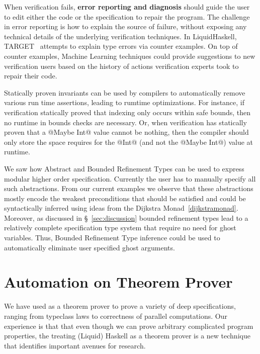 When verification fails, 
\textbf{error reporting and diagnosis} should guide the user 
to edit either the code or the specification to repair the program. 
%
The challenge in error reporting is how to explain 
the source of failure, 
without exposing any technical details 
of the underlying verification techniques. 
%
In LiquidHaskell, TARGET~\cite{TARGET} attempts to explain 
type errors via counter examples. 
%
On top of counter examples, %
Machine Learning techniques could 
provide suggestions to new verification users
based on the history of actions verification experts 
took to repair their code.  
% 

Statically proven invariants can be used by compilers 
to automatically remove various run time assertions, 
leading to rumtime optimizations.
For instance, if verification statically proved that indexing only occurs
within safe bounds, then no runtime in bounds checks are necessary. 
%
Or, when verification has statically proven that a @Maybe Int@ value cannot be nothing, 
then the compiler should only store the space requires for the @Int@ (and not the @Maybe Int@)
value at runtime. 


\label{future:ghost}
We saw how Abstract and Bounded Refinement Types can be used to express 
modular higher order specification. 
%
Currently the user has to manually specify all such abstractions. 
From our current examples we observe that these abstractions mostly encode 
the weakest preconditions that should be satisfied and could be syntactically 
inferred using ideas from the Dijkstra Monad~\ref{dijkstramonad}. 
%
Moreover, as discussed in \S~\ref{sec:discussion}
bounded refinement types lead to a relatively complete 
specification type system that require no need for ghost variables. 
Thus, Bounded Refinement Type inference could be used to automatically eliminate 
user specified ghost arguments. 

\section{Automation on Theorem Prover}
\label{future:theoremproving}

We have used \toolname as a theorem prover 
to prove a variety of deep specifications, 
ranging from typeclass laws to correctness of parallel computations. 
%
Our experience is that that even though we can prove arbitrary complicated 
program properties, the treating (Liquid) Haskell as a theorem prover 
is a new technique that identifies
important avenues for research.

